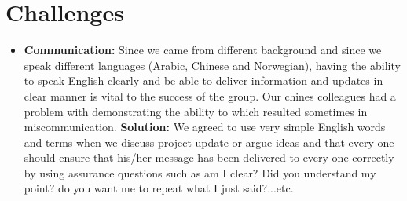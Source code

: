 \documentclass{article}
\begin{document}
\section{Challenges}
\begin{itemize}
\item \textbf{Communication:} Since we came from different background and since we speak different languages (Arabic, Chinese and Norwegian), having the ability to speak English clearly and be able to deliver information and updates in clear manner is vital to the success of the group. Our chines colleagues had a problem with demonstrating the ability to which resulted sometimes in miscommunication. \textbf{Solution:} We agreed to use very simple English words and terms when we discuss project update or argue ideas and that every one should ensure that his/her message has been delivered to every one correctly by using assurance questions such as am I clear? Did you understand my point? do you want me to repeat what I just said?...etc.


\end{itemize}
\end{document}
